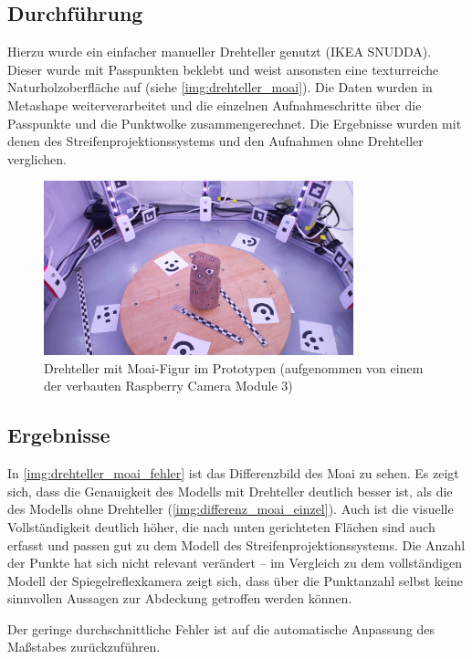 \documentclass[./00PhotoBox.tex]{subfiles}
\begin{document}
\subsection{Durchführung}
Hierzu wurde ein einfacher manueller Drehteller genutzt (IKEA SNUDDA). Dieser wurde mit Passpunkten beklebt und weist ansonsten eine texturreiche Naturholzoberfläche auf (siehe \autoref{img:drehteller_moai}). Die Daten wurden in Metashape weiterverarbeitet und die einzelnen Aufnahmeschritte über die Passpunkte und die Punktwolke zusammengerechnet. Die Ergebnisse wurden mit denen des Streifenprojektionssystems und den Aufnahmen ohne Drehteller verglichen.

\begin{figure}
    \centering
    \includegraphics[width=0.8\textwidth]{img/drehteller_moai.jpg}
    \caption{Drehteller mit Moai-Figur im Prototypen (aufgenommen von einem der verbauten Raspberry Camera Module 3)}
    \label{img:drehteller_moai}
\end{figure}

\subsection{Ergebnisse}

In \autoref{img:drehteller_moai_fehler} ist das Differenzbild des Moai zu sehen. Es zeigt sich, dass die Genauigkeit des Modells mit Drehteller deutlich besser ist, als die des Modells ohne Drehteller (\autoref{img:differenz_moai_einzel}). Auch ist die visuelle Vollständigkeit deutlich höher, die nach unten gerichteten Flächen sind auch erfasst und passen gut zu dem Modell des Streifenprojektionssystems. Die Anzahl der Punkte hat sich nicht relevant verändert -- im Vergleich zu dem vollständigen Modell der Spiegelreflexkamera zeigt sich, dass über die Punktanzahl selbst keine sinnvollen Aussagen zur Abdeckung getroffen werden können.

Der geringe durchschnittliche Fehler ist auf die automatische Anpassung des Maßstabes zurückzuführen.
\end{document}
